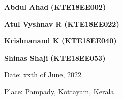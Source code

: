 



\vspace*{\fill}

\begin{multicols}{4}
\centering

\textbf{Abdul Ahad}
\vspace{0.2cm}
\textbf{(KTE18EE002)}\\
\vspace{0.2cm}

\textbf{Atul Vyshnav R}
\vspace{0.2cm}
\textbf{(KTE18EE022)}\\
\vspace{0.2cm}

\textbf{Krishnanand K}
\vspace{0.2cm}
\textbf{(KTE18EE040)}\\
\vspace{0.2cm}

\textbf{Shinas Shaji}
\vspace{0.2cm}
\textbf{(KTE18EE053)}\\
\vspace{0.2cm}

\end{multicols}

\vspace{1cm}
\begin{multicols}{2}

\flushleft Date: xxth of June, 2022

\flushright Place: Pampady, Kottayam, Kerala

\end{multicols}

